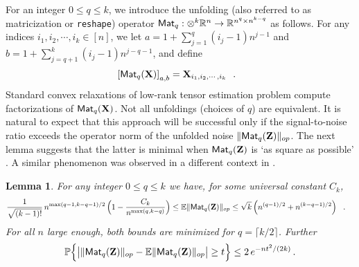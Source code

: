 \documentclass[11pt]{article}
\newtheorem{lemma}[claim]{Lemma}
\theoremstyle{definition}
\def\prob{{\mathbb P}}
\def\E{{\mathbb E}} %
\def\reals{\mathbb{R}}
\def\bX{\mathbf{X}}
\def\bZ{\mathbf{Z}}
\def\E{\mathbb{E}}
\def\M{{\sf Mat}}
\begin{document}
For an integer  $0\le q \le k$, we  introduce  the unfolding (also referred to as matricization or {\tt reshape}) 
operator $\M_q : \otimes^k\reals^n \to \reals^{n^q \times n^{k-q}}$ as
follows.
For  any indices $ i_1,i_2,\cdots, i_k\in [n]$,
we let  $a = 1+\sum_{j=1}^q (i_j-1) n^{j-1}$ and $b = 1+\sum_{j=q+1}^k
(i_j-1) n^{j-q-1}$, and define
%
\begin{equation}\label{eq:defMatricization} 
%
\left [ \M_q(\bX)\right ]_{a,b}= \bX_{i_1,i_2,\cdots,i_k}~~.~~
%
\end{equation}
%
Standard convex relaxations of low-rank tensor estimation problem
compute factorizations of   $\M_q(\bX)$\cite{Tomika11,Liu12,mu13,Romera13}. 
Not all unfoldings (choices of $q$) are equivalent.
It is natural to expect that this approach will be successful only if
the signal-to-noise ratio exceeds the operator norm of the
unfolded noise $\|\M_q(\bZ)\|_{op}$. The next lemma
suggests that the latter is minimal when $\M_q(\bZ)$ is `as square
as possible' .
A similar phenomenon was observed in a different context in \cite{mu13}.
%
\begin{lemma}\label{lem:upperBoundMatricized} 
For any integer $0\leq q\leq k$ we have, for some universal constant $C_k$,
%
 \begin{align}
%
 \frac{1}{\sqrt{(k-1)!}}\, n^{\max(q-1,k-q-1)/2}\,\Big(1-\frac{C_k}{n^{\max(q,k-q)}}\Big)\le
\E
\|\M_q(\bZ)\|_{op}&\leq \sqrt k \left ( n^{(q-1)/2} + n^{(k-q-1)/2}
\right )~~.\label{eq:NormMatricized}
%
 \end{align}
%
 For all $n$ large enough, both  bounds are minimized for $q = \lceil
 k/2 \rceil$.
Further
%
\begin{align}
%
\prob\Big\{\big|\|\M_q(\bZ)\|_{op}-\E\|\M_q(\bZ)\|_{op} \big| \ge t
\Big\}\le 2\, e^{-nt^2/(2k)}\, . \label{eq:ConcentrationMatricized}
%
\end{align}
\end{lemma}
%
\end{document}
